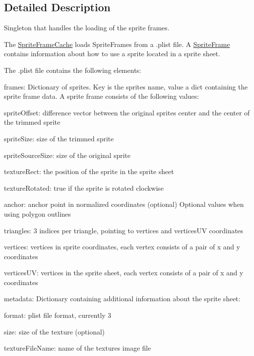 \subsection{Detailed Description}
Singleton that handles the loading of the sprite frames. 

The \hyperlink{classSpriteFrameCache}{Sprite\+Frame\+Cache} loads Sprite\+Frames from a .plist file. A \hyperlink{classSpriteFrame}{Sprite\+Frame} contains information about how to use a sprite located in a sprite sheet.

The .plist file contains the following elements\+:


\begin{DoxyItemize}
\item {\ttfamily frames}\+: Dictionary of sprites. Key is the sprite\textquotesingle{}s name, value a dict containing the sprite frame data. A sprite frame consists of the following values\+:
\begin{DoxyItemize}
\item {\ttfamily sprite\+Offset}\+: difference vector between the original sprite\textquotesingle{}s center and the center of the trimmed sprite
\item {\ttfamily sprite\+Size}\+: size of the trimmed sprite
\item {\ttfamily sprite\+Source\+Size}\+: size of the original sprite
\item {\ttfamily texture\+Rect}\+: the position of the sprite in the sprite sheet
\item {\ttfamily texture\+Rotated}\+: true if the sprite is rotated clockwise
\item {\ttfamily anchor}\+: anchor point in normalized coordinates (optional) Optional values when using polygon outlines
\item {\ttfamily triangles}\+: 3 indices per triangle, pointing to vertices and vertices\+UV coordinates
\item {\ttfamily vertices}\+: vertices in sprite coordinates, each vertex consists of a pair of x and y coordinates
\item {\ttfamily vertices\+UV}\+: vertices in the sprite sheet, each vertex consists of a pair of x and y coordinates
\end{DoxyItemize}
\item {\ttfamily metadata}\+: Dictionary containing additional information about the sprite sheet\+:
\begin{DoxyItemize}
\item {\ttfamily format}\+: plist file format, currently 3
\item {\ttfamily size}\+: size of the texture (optional)
\item {\ttfamily texture\+File\+Name}\+: name of the texture\textquotesingle{}s image file
\end{DoxyItemize}
\end{DoxyItemize}

